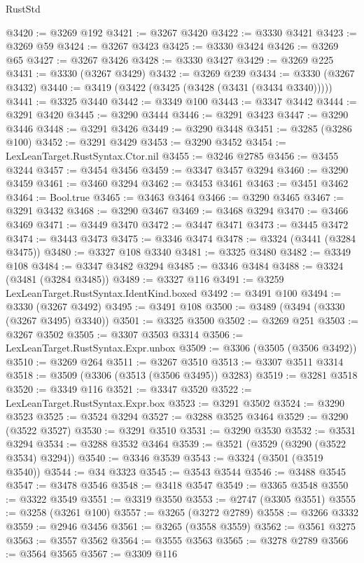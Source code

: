 \begin{lexlean}{RustStd}
\begin{coremodule}
@3420 := @3269 @192
@3421 := @3267 @3420
@3422 := @3330 @3421
@3423 := @3269 @59
@3424 := @3267 @3423
@3425 := @3330 @3424
@3426 := @3269 @65
@3427 := @3267 @3426
@3428 := @3330 @3427
@3429 := @3269 @225
@3431 := @3330 (@3267 @3429)
@3432 := @3269 @239
@3434 := @3330 (@3267 @3432)
@3440 := @3419 (@3422 (@3425 (@3428 (@3431 (@3434 @3340)))))
@3441 := @3325 @3440
@3442 := @3349 @100
@3443 := @3347 @3442
@3444 := @3291 @3420
@3445 := @3290 @3444
@3446 := @3291 @3423
@3447 := @3290 @3446
@3448 := @3291 @3426
@3449 := @3290 @3448
@3451 := @3285 (@3286 @100)
@3452 := @3291 @3429
@3453 := @3290 @3452
@3454 := LexLeanTarget.RustSyntax.Ctor.nil
@3455 := @3246 @2785
@3456 := @3455 @3244
@3457 := @3454 @3456
@3459 := @3347 @3457 @3294
@3460 := @3290 @3459
@3461 := @3460 @3294
@3462 := @3453 @3461
@3463 := @3451 @3462
@3464 := Bool.true
@3465 := @3463 @3464
@3466 := @3290 @3465
@3467 := @3291 @3432
@3468 := @3290 @3467
@3469 := @3468 @3294
@3470 := @3466 @3469
@3471 := @3449 @3470
@3472 := @3447 @3471
@3473 := @3445 @3472
@3474 := @3443 @3473
@3475 := @3346 @3474
@3478 := @3324 (@3441 (@3284 @3475))
@3480 := @3327 @108 @3340
@3481 := @3325 @3480
@3482 := @3349 @108
@3484 := @3347 @3482 @3294
@3485 := @3346 @3484
@3488 := @3324 (@3481 (@3284 @3485))
@3489 := @3327 @116
@3491 := @3259 LexLeanTarget.RustSyntax.IdentKind.boxed
@3492 := @3491 @100
@3494 := @3330 (@3267 @3492)
@3495 := @3491 @108
@3500 := @3489 (@3494 (@3330 (@3267 @3495) @3340))
@3501 := @3325 @3500
@3502 := @3269 @251
@3503 := @3267 @3502
@3505 := @3307 @3503 @3314
@3506 := LexLeanTarget.RustSyntax.Expr.unbox
@3509 := @3306 (@3505 (@3506 @3492))
@3510 := @3269 @264
@3511 := @3267 @3510
@3513 := @3307 @3511 @3314
@3518 := @3509 (@3306 (@3513 (@3506 @3495)) @3283)
@3519 := @3281 @3518
@3520 := @3349 @116
@3521 := @3347 @3520
@3522 := LexLeanTarget.RustSyntax.Expr.box
@3523 := @3291 @3502
@3524 := @3290 @3523
@3525 := @3524 @3294
@3527 := @3288 @3525 @3464
@3529 := @3290 (@3522 @3527)
@3530 := @3291 @3510
@3531 := @3290 @3530
@3532 := @3531 @3294
@3534 := @3288 @3532 @3464
@3539 := @3521 (@3529 (@3290 (@3522 @3534) @3294))
@3540 := @3346 @3539
@3543 := @3324 (@3501 (@3519 @3540))
@3544 := @34 @3323
@3545 := @3543 @3544
@3546 := @3488 @3545
@3547 := @3478 @3546
@3548 := @3418 @3547
@3549 := @3365 @3548
@3550 := @3322 @3549
@3551 := @3319 @3550
@3553 := @2747 (@3305 @3551)
@3555 := @3258 (@3261 @100)
@3557 := @3265 (@3272 @2789)
@3558 := @3266 @3332
@3559 := @2946 @3456
@3561 := @3265 (@3558 @3559)
@3562 := @3561 @3275
@3563 := @3557 @3562
@3564 := @3555 @3563
@3565 := @3278 @2789
@3566 := @3564 @3565
@3567 := @3309 @116

\end{coremodule}
\end{lexlean}
